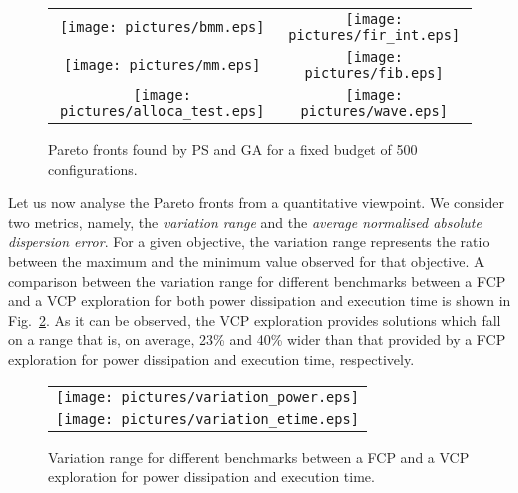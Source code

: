 \begin{itemize}
\begin{figure}
  \centering
  \begin{tabular}{cc}
    \texttt{[image: pictures/bmm.eps]} & \texttt{[image: pictures/fir\_int.eps]} \\
    \texttt{[image: pictures/mm.eps]} & \texttt{[image: pictures/fib.eps]} \\
    \texttt{[image: pictures/alloca\_test.eps]} & \texttt{[image: pictures/wave.eps]}
  \end{tabular}
  \caption{Pareto fronts found by PS and GA for a fixed budget of 500 configurations.}
  \label{fig:pareto_fronts}
\end{figure}

Let us now analyse the Pareto fronts from a quantitative viewpoint. We
consider two metrics, namely, the \emph{variation range} and the
\emph{average normalised absolute dispersion error}. For a given
objective, the variation range represents the ratio between the
maximum and the minimum value observed for that objective. A
comparison between the variation range for different benchmarks
between a FCP and a VCP exploration for both power dissipation and
execution time is shown in Fig.~\ref{fig:variation_range}. As it can
be observed, the VCP exploration provides solutions which fall on a
range that is, on average, 23\% and 40\% wider than that provided by a
FCP exploration for power dissipation and execution time,
respectively.
\begin{figure}
  \centering
  \begin{tabular}{c}
    \texttt{[image: pictures/variation\_power.eps]} \\
    \texttt{[image: pictures/variation\_etime.eps]}
  \end{tabular}
  \caption{Variation range for different benchmarks between a FCP and
    a VCP exploration for power dissipation and execution time.}
  \label{fig:variation_range}
\end{figure}



\end{itemize}
